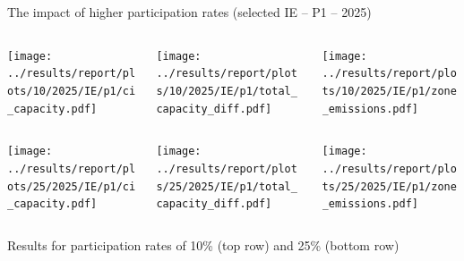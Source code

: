 \begin{frame}{The impact of higher participation rates (selected IE -- P1 -- 2025)}

  {\footnotesize

  \begin{columns}
  \begin{column}{5cm}
  \centering
  \texttt{[image: ../results/report/plots/10/2025/IE/p1/ci\_capacity.pdf]}
  \end{column}

  \begin{column}{5cm}
  \centering
  \texttt{[image: ../results/report/plots/10/2025/IE/p1/total\_capacity\_diff.pdf]}
  \end{column}

  \begin{column}{5cm}
  \centering
  \texttt{[image: ../results/report/plots/10/2025/IE/p1/zone\_emissions.pdf]}
  \end{column}

  \end{columns}

  \begin{columns}
    \begin{column}{5cm}
    \centering
    \texttt{[image: ../results/report/plots/25/2025/IE/p1/ci\_capacity.pdf]}
    \end{column}
  
    \begin{column}{5cm}
    \centering
    \texttt{[image: ../results/report/plots/25/2025/IE/p1/total\_capacity\_diff.pdf]}
    \end{column}
  
    \begin{column}{5cm}
    \centering
    \texttt{[image: ../results/report/plots/25/2025/IE/p1/zone\_emissions.pdf]}
    \end{column}

  \end{columns}

  \begin{columns}
    \begin{column}{15cm}
    {\scriptsize
    Results for participation rates of 10\% (top row) and 25\% (bottom row)
    }
    \end{column}
    \end{columns}
  }

\end{frame}



